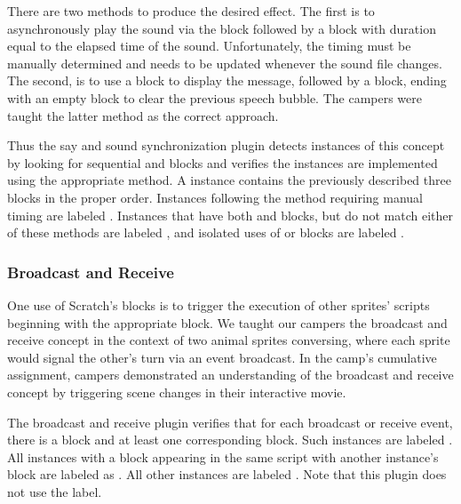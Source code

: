 There are two methods to produce the desired effect.  The first is to
asynchronously play the sound via the \playsound{} block followed by a
\sayfor{} block with duration equal to the elapsed time of the sound.
Unfortunately, the timing must be manually determined and needs to be updated
whenever the sound file changes.  The second, is to use a \say{} block to
display the message, followed by a \playsounddone{} block, ending with an empty
\say{} block to clear the previous speech bubble. The campers were taught the
latter method as the correct approach.

Thus the say and sound synchronization plugin detects instances of this concept
by looking for sequential \say{} and \playsound{} blocks and verifies the
instances are implemented using the appropriate method.  A \correct{} instance
contains the previously described three blocks in the proper order.  Instances
following the method requiring manual timing are labeled \semincor{}. Instances
that have both \say{} and \playsound{} blocks, but do not match either of these
methods are labeled \incor{}, and isolated uses of \say{} or \playsound{}
blocks are labeled \incom{}.


\subsubsection{Broadcast and Receive}
One use of Scratch's \broadcast{} blocks is to trigger the execution of other
sprites' scripts beginning with the appropriate \receive{} block. We taught our
campers the broadcast and receive concept in the context of two animal sprites
conversing, where each sprite would signal the other's turn via an event
broadcast. In the camp's cumulative assignment, campers demonstrated an
understanding of the broadcast and receive concept by triggering scene changes
in their interactive movie.

The broadcast and receive plugin verifies that for each broadcast or receive
event, there is a \broadcast{} block and at least one corresponding \receive{}
block. Such instances are labeled \correct{}. All instances with a \broadcast{}
block appearing in the same script with another instance's \broadcast{} block
are labeled as \semincor{}. All other instances are labeled \incom{}. Note that
this plugin does not use the \incor{} label.

